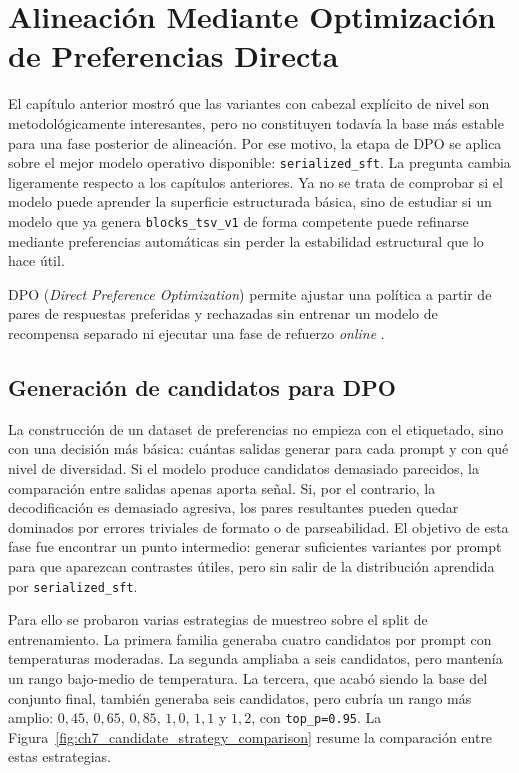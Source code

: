 %
\chapter{Alineación Mediante Optimización de Preferencias Directa}
\label{ch::chapter7}

El capítulo anterior mostró que las variantes con cabezal explícito de nivel son metodológicamente
interesantes, pero no constituyen todavía la base más estable para una fase posterior de alineación.
Por ese motivo, la etapa de DPO se aplica sobre el mejor modelo operativo disponible:
\texttt{serialized\_sft}. La pregunta cambia ligeramente respecto a los capítulos anteriores. Ya no se
trata de comprobar si el modelo puede aprender la superficie estructurada básica, sino de estudiar si
un modelo que ya genera \texttt{blocks\_tsv\_v1} de forma competente puede refinarse mediante
preferencias automáticas sin perder la estabilidad estructural que lo hace útil.

DPO (\textit{Direct Preference Optimization}) permite ajustar una política a partir de pares de
respuestas preferidas y rechazadas sin entrenar un modelo de recompensa separado ni ejecutar una fase
de refuerzo \textit{online} \citep{rafailov2023dpo}.

\section{Generación de candidatos para DPO}
\label{sec:ch7_candidate_generation}

La construcción de un dataset de preferencias no empieza con el etiquetado, sino con una decisión
más básica: cuántas salidas generar para cada prompt y con qué nivel de diversidad. Si el modelo
produce candidatos demasiado parecidos, la comparación entre salidas apenas aporta señal. Si, por el
contrario, la decodificación es demasiado agresiva, los pares resultantes pueden quedar dominados por
errores triviales de formato o de parseabilidad. El objetivo de esta fase fue encontrar un punto
intermedio: generar suficientes variantes por prompt para que aparezcan contrastes útiles, pero sin
salir de la distribución aprendida por \texttt{serialized\_sft}.

Para ello se probaron varias estrategias de muestreo sobre el split de entrenamiento. La primera
familia generaba cuatro candidatos por prompt con temperaturas moderadas. La segunda ampliaba a seis
candidatos, pero mantenía un rango bajo-medio de temperatura. La tercera, que acabó siendo la base
del conjunto final, también generaba seis candidatos, pero cubría un rango más amplio:
\(0{,}45\), \(0{,}65\), \(0{,}85\), \(1{,}0\), \(1{,}1\) y \(1{,}2\), con \texttt{top\_p=0.95}.
La Figura~\ref{fig:ch7_candidate_strategy_comparison} resume la comparación entre estas estrategias.

